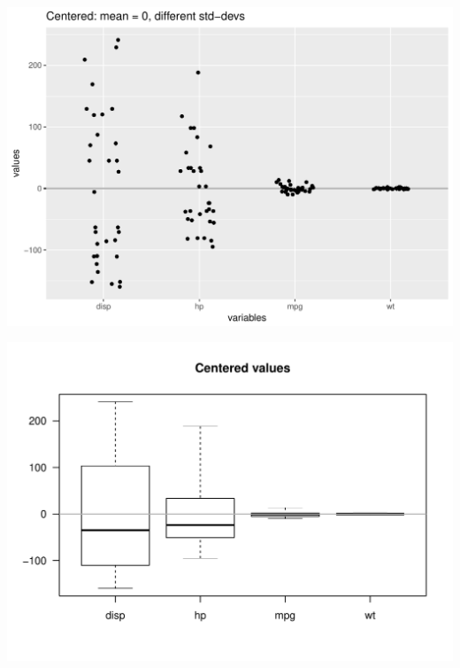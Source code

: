 \documentclass[12pt]{beamer}\usepackage[]{graphicx}\usepackage[]{color}
\makeatletter
\def\maxwidth{ %
  \ifdim\Gin@nat@width>\linewidth
    \linewidth
  \else
    \Gin@nat@width
  \fi
}
\newenvironment{knitrout}{}{} %
\makeatother
\begin{document}
\begin{frame}[fragile]



\begin{knitrout}\footnotesize
{}\color{fgcolor}

{\centering \includegraphics[width=\maxwidth]{figure/unnamed-chunk-5-1} 

}



\end{knitrout}

\end{frame}


\begin{frame}[fragile]

\begin{knitrout}\footnotesize
{}\color{fgcolor}

{\centering \includegraphics[width=\maxwidth]{figure/unnamed-chunk-6-1} 

}



\end{knitrout}

\end{frame}
\end{document}

